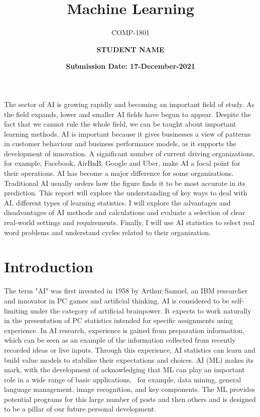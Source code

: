 \documentclass[10pt]{aa}
\begin{document}
 


   \title{Machine Learning}
      \subtitle{COMP-1801}

   \author{\textbf{STUDENT NAME}}

   \date{\textbf{Submission Date: 17-December-2021}}

 
  \abstract
  {The sector of AI is growing rapidly and becoming an important field of study. As the field expands, lower and smaller AI fields have begun to appear. Despite the fact that we cannot rule the whole field, we can be taught about important learning methods. AI is important because it gives businesses a view of patterns in customer behaviour and business performance models, as it supports the development of innovation. A significant number of current driving organizations, for example, Facebook, AirBnB, Google and Uber, make AI a focal point for their operations. AI has become a major difference for some organizations. Traditional AI usually orders how the figure finds it to be most accurate in its prediction. This report will explore the understanding of key ways to deal with AI, different types of learning statistics. I will explore the advantages and disadvantages of AI methods and calculations and evaluate a selection of clear real-world settings and requirements. Finally, I will use AI statistics to select real word problems and understand cycles related to their organization.}

   \maketitle
\section{Introduction}
The term "AI" was first invented in 1958 by Arthur Samuel, an IBM researcher and innovator in PC games and artificial thinking. AI is considered to be self-limiting under the category of artificial brainpower. It expects to work naturally in the presentation of PC statistics intended for specific assignments using experience. In AI research, experience is gained from preparation information, which can be seen as an example of the information collected from recently recorded ideas or live inputs. Through this experience, AI statistics can learn and build value models to stabilise their expectations and choices. AI (ML) makes its mark, with the development of acknowledging that ML can play an important role in a wide range of basic applications,~\cite{chaurasia_2020_covid19} for example, data mining, general language management, image recognition, and key components. The ML provides potential programs for this large number of posts and then others and is designed to be a pillar of our future personal development.
\end{document}
